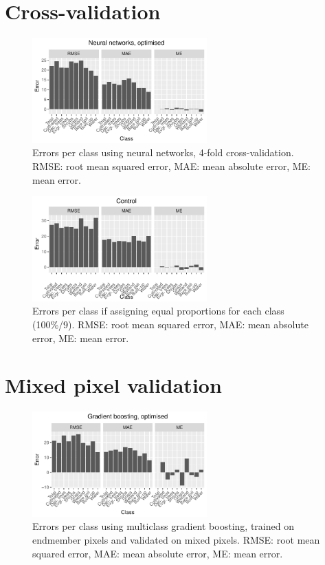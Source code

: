 \documentclass[a4paper,12pt]{scrbook}
\begin{document}
\begin{appendices}
 \section{Cross-validation}
 \begin{figure}[!h]
  \centering
  \includegraphics[width=0.6\textwidth]{../plot/perclass-errors-nn}
  \caption{Errors per class using neural networks, 4-fold cross-validation. RMSE: root mean squared error, MAE: mean absolute error, ME: mean error.}
  \label{fig-perclass-errors-nn}
 \end{figure}
 \begin{figure}[!h]
  \centering
  \includegraphics[width=0.6\textwidth]{../plot/perclass-errors-ctrl}
  \caption{Errors per class if assigning equal proportions for each class (100\%/9). RMSE: root mean squared error, MAE: mean absolute error, ME: mean error.}
  \label{fig-perclass-errors-ctrl}
 \end{figure}
 
 \section{Mixed pixel validation}
 \begin{figure}[!h]
  \centering
  \includegraphics[width=0.6\textwidth]{../plot/perclass-errors-gb}
  \caption{Errors per class using multiclass gradient boosting, trained on endmember pixels and validated on mixed pixels. RMSE: root mean squared error, MAE: mean absolute error, ME: mean error.}
  \label{fig-perclass-errors-gb}
 \end{figure}
 

\end{appendices}
\end{document}
